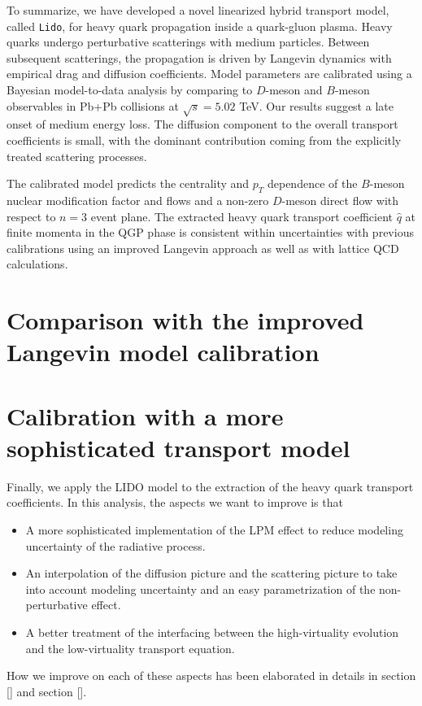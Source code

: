 To summarize, we have developed a novel linearized hybrid transport model, called {\tt Lido}, for heavy quark propagation inside a quark-gluon plasma.
Heavy quarks undergo perturbative scatterings with medium particles. Between subsequent scatterings, the propagation is driven by Langevin dynamics with empirical drag and diffusion coefficients.
Model parameters are calibrated using a Bayesian model-to-data analysis by comparing to $D$-meson and $B$-meson observables in Pb+Pb collisions at $\sqrt{s}=5.02$ TeV.
Our results suggest a late onset of medium energy loss.
The diffusion component to the overall transport coefficients is small, with the dominant contribution coming from the explicitly treated scattering processes.

The calibrated model predicts the centrality and $p_T$ dependence of the $B$-meson nuclear modification factor and flows and a non-zero $D$-meson direct flow with respect to $n=3$ event plane.
The extracted heavy quark transport coefficient $\hat{q}$ at finite momenta in the QGP phase is consistent within uncertainties with previous calibrations using an improved Langevin approach as well as with lattice QCD calculations.

\section{Comparison with the improved Langevin model calibration}

\section{Calibration with a more sophisticated transport model}
Finally, we apply the LIDO model to the extraction of the heavy quark transport coefficients.
In this analysis, the aspects we want to improve is that 
\begin{itemize}
\item A more sophisticated implementation of the LPM effect to reduce modeling uncertainty of the radiative process.
\item An interpolation of the diffusion picture and the scattering picture to take into account modeling uncertainty and an easy parametrization of the non-perturbative effect.
\item A better treatment of the interfacing between the high-virtuality evolution and the low-virtuality transport equation.
\end{itemize}
How we improve on each of these aspects has been elaborated in details in section [] and section [].

